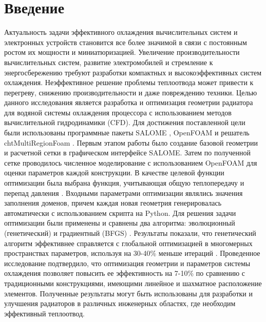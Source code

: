 \documentclass[a4paper,12pt]{extreport}
\numberwithin{equation}{chapter}
\begin{document}

\tableofcontents
\setcounter{page}{3}

\chapter*{Введение}

Актуальность задачи эффективного охлаждения вычислительных систем и электронных устройств становится все более значимой в связи с постоянным ростом их мощности и миниатюризацией.
Увеличение производительности вычислительных систем, развитие электромобилей \cite{li_analysis_2022} и стремление к энергосбережению требуют разработки компактных и высокоэффективных систем охлаждения.
Неэффективное решение проблемы теплоотвода может привести к перегреву, снижению производительности и даже повреждению техники. 
Целью данного исследования является разработка и оптимизация геометрии радиатора для водяной системы охлаждения процессора с использованием методов вычислительной гидродинамики (CFD).
Для достижения поставленной цели были использованы программные пакеты SALOME \cite{wOfDocSalome}, OpenFOAM и решатель chtMultiRegionFoam \cite{wChtMultiRegionFoam}. 
Первым этапом работы было создание базовой геометрии и расчетной сетки в графическом интерфейсе SALOME.
Затем по полученной сетке проводилось численное моделирование с использованием OpenFOAM для оценки параметров каждой конструкции.
В качестве целевой функции оптимизации была выбрана функция, учитывающая общую теплопередачу и перепад давления \cite{mekki_genetic_2021}.
Входными параметрами оптимизации являлись значения заполнения доменов, причем каждая новая геометрия генерировалась автоматически с использованием скрипта на Python.
Для решения задачи оптимизации были применены и сравнены два алгоритма: эволюционный (генетический) и градиентный (BFGS) \cite{limited_BFGS}.
Результаты показали, что генетический алгоритм эффективнее справляется с глобальной оптимизацией в многомерных пространствах параметров, используя на 30-40\% меньше итераций \cite{Chernyshev2007}. 
Проведенное исследование подтвердило, что оптимизация геометрии и параметров системы охлаждения позволяет повысить ее эффективность на 7-10\% по сравнению с традиционными конструкциями, имеющими линейное и шахматное расположение элементов.
Полученные результаты могут быть использованы для разработки и улучшения радиаторов в различных инженерных областях, где необходим эффективный теплоотвод.
\end{document}
